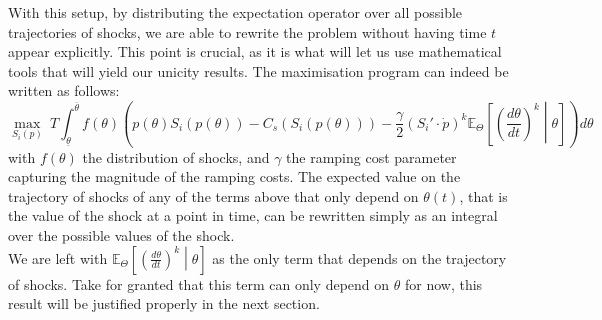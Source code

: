 With this setup, by distributing the expectation operator over all possible trajectories of shocks, we are able to rewrite the problem without having time $t$ appear explicitly. This point is crucial, as it is what will let us use mathematical tools that will yield our unicity results. The maximisation program can indeed be written as follows:
\begin{equation}
\displaystyle{\max_{S_i(p)}}~T\int_{\underline{\theta}}^{\overline{\theta}} f(\theta)\left(p(\theta)S_i(p(\theta)) -C_s(S_i(p(\theta)))-\frac{\gamma}{2}\left(S_i'\cdot\dot{p}\right)^k\mathbb{E}_{\Theta}\left[\left(\frac{d\theta}{dt}\right)^k\middle \vert \theta  \right]\right)d\theta
\label{maxbase}
\end{equation}
with $f(\theta)$ the distribution of shocks, and $\gamma$ the ramping cost parameter capturing the magnitude of the ramping costs. The expected value on the trajectory of shocks of any of the terms above that only depend on $\theta(t)$, that is the value of the shock at a point in time, can be rewritten simply as an integral over the possible values of the shock. \\

We are left with $\mathbb{E}_{\Theta}\left[\left(\frac{d\theta}{dt}\right)^k\middle \vert \theta  \right]$ as the only term that depends on the trajectory of shocks. Take for granted that this term can only depend on $\theta$ for now, this result will be justified properly in the next section. \\

